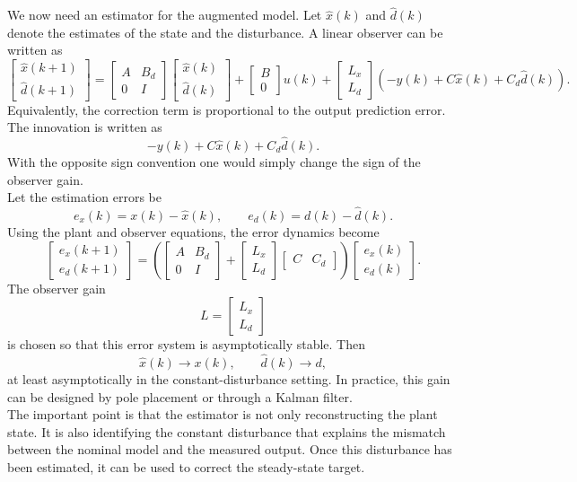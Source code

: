 We now need an estimator for the augmented model. Let \(\hat x(k)\) and \(\hat d(k)\) denote
the estimates of the state and the disturbance. A linear observer can be written as
\[
\begin{bmatrix}
    \hat x(k+1)\\
    \hat d(k+1)
\end{bmatrix}
=
\begin{bmatrix}
    A & B_d\\
    0 & I
\end{bmatrix}
\begin{bmatrix}
    \hat x(k)\\
    \hat d(k)
\end{bmatrix}
+
\begin{bmatrix}
    B\\
    0
\end{bmatrix}
u(k)
+
\begin{bmatrix}
    L_x\\
    L_d
\end{bmatrix}
\left(-y(k)+C\hat x(k)+C_d\hat d(k)\right).
\]
Equivalently, the correction term is proportional to the output prediction error. The innovation is written as
\[
    -y(k)+C\hat x(k)+C_d\hat d(k).
\]
With the opposite sign convention one would simply change the sign of the observer gain.\\
Let the estimation errors be
\[
    e_x(k)=x(k)-\hat x(k),
    \qquad
    e_d(k)=d(k)-\hat d(k).
\]
Using the plant and observer equations, the error dynamics become
\[
\begin{bmatrix}
    e_x(k+1)\\
    e_d(k+1)
\end{bmatrix}
=
\left(
\begin{bmatrix}
    A & B_d\\
    0 & I
\end{bmatrix}
+
\begin{bmatrix}
    L_x\\
    L_d
\end{bmatrix}
\begin{bmatrix}
    C & C_d
\end{bmatrix}
\right)
\begin{bmatrix}
    e_x(k)\\
    e_d(k)
\end{bmatrix}.
\]
The observer gain
\[
    L=
    \begin{bmatrix}
        L_x\\ L_d
    \end{bmatrix}
\]
is chosen so that this error system is asymptotically stable. Then
\[
    \hat x(k)\to x(k),
    \qquad
    \hat d(k)\to d,
\]
at least asymptotically in the constant-disturbance setting. In practice, this gain can be designed
by pole placement or through a Kalman filter.\\
The important point is that the estimator is not only reconstructing the plant state. It is also
identifying the constant disturbance that explains the mismatch between the nominal model and
the measured output. Once this disturbance has been estimated, it can be used to correct the
steady-state target.


